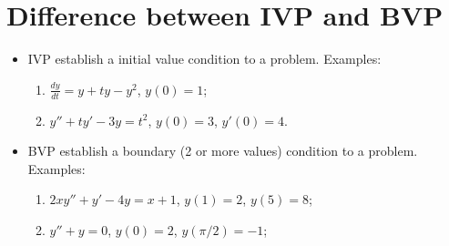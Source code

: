 \section{Difference between IVP and BVP}
	\begin{itemize}
		\item{IVP establish a initial value condition to a problem. Examples:
			\begin{enumerate}
				\item{$\frac{dy}{dt} = y + ty - y^{2}$, $y(0) = 1$;}
				\item{$y'' + ty' - 3y = t^{2}$, $y(0) = 3$, $y'(0) = 4$.}
			\end{enumerate}}
		\item{BVP establish a boundary (2 or more values) condition to a problem. Examples:
			\begin{enumerate}
				\item{$2xy'' + y' - 4y = x + 1$, $y(1) = 2$, $y(5) = 8$;}
				\item{$y'' + y = 0$, $y(0) = 2$, $y(\pi/2) = -1$;}
			\end{enumerate}}
	\end{itemize}
